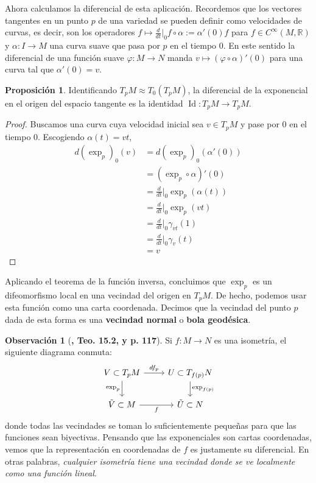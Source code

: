 \documentclass[spanish]{book}
\theoremstyle{definition}
\newtheorem*{prop}{Proposición}
\newtheorem*{obs}{Observación}
\newcommand{\R}{\mathbb{R}}
\newcommand{\Cinf}{C^\infty}
\DeclareMathOperator{\Id}{Id}
\begin{document}
	Ahora calculamos la diferencial de esta aplicación. Recordemos que los vectores tangentes en un punto $p$ de una variedad se pueden definir como velocidades de curvas, es decir, son los operadores $f\mapsto \frac{d}{dt}\big|_0f\circ\alpha:=\alpha'(0)f$ para $f\in\Cinf(M,\R)$ y $\alpha:I\to M$ una curva suave que pasa por $p$ en el tiempo 0. En este sentido la diferencial de una función suave $\varphi:M\to N$ manda $v\mapsto (\varphi\circ\alpha)'(0)$ para una curva tal que $\alpha'(0)=v$.
	
	\begin{prop}
		Identificando $T_pM\approx T_0(T_pM)$, la diferencial de la exponencial en el origen del espacio tangente es la identidad $\Id:T_pM\to T_pM$.
	\end{prop}
	\begin{proof}
		Buscamos una curva cuya velocidad inicial sea $v\in T_pM$ y pase por $0$ en el tiempo $0$. Escogiendo $\alpha(t)=vt$,
		\begin{align*}
			d(\exp_p)_0(v)&=d(\exp_p)_0(\alpha'(0))\\
			&=(\exp_p\circ\alpha)'(0)\\
			&=\frac{d}{dt}\Big|_0\exp_p(\alpha(t))\\
			&=\frac{d}{dt}\Big|_0\exp_p(vt)\\
			&=\frac{d}{dt}\Big|_0\gamma_{vt}(1)\\
			&=\frac{d}{dt}\Big|_0\gamma_v(t)\\
			&=v
		\end{align*}
	\end{proof}
	
	Aplicando el teorema de la función inversa, concluimos que $\exp_p$ es un difeomorfismo local en una vecindad del origen en $T_pM$. De hecho, podemos usar esta función como una carta coordenada. Decimos que la vecindad del punto $p$ dada de esta forma es una \textbf{vecindad normal} o \textbf{bola geodésica}.
	
	\begin{obs}[\cite{Loring-dif}\textbf{, Teo. 15.2, y p. 117}]
		Si $f:M\to N$ es una isometría, el siguiente diagrama conmuta:
		\[\begin{tikzcd}
			V\subset T_pM\arrow{r}{df_p}\arrow[swap]{d}{\exp_p}&U\subset T_{f(p)}N\arrow{d}{\exp_{f(p)}}\\
			\tilde{V}\subset M\arrow[swap]{r}{f}&\tilde{U}\subset N
		\end{tikzcd}\]
		donde todas las vecindades se toman lo suficientemente pequeñas para que las funciones sean biyectivas. Pensando que las exponenciales son cartas coordenadas, vemos que la representación en coordenadas de $f$ es justamente su diferencial. En otras palabras, \textit{cualquier isometría tiene una vecindad donde se ve localmente como una función lineal}.
	\end{obs}
	
\end{document}
